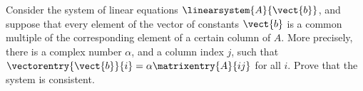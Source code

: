 Consider the system of linear equations $\linearsystem{A}{\vect{b}}$, and suppose that every element of the vector of constants $\vect{b}$ is a common multiple of the corresponding element of a certain column of $A$.  More precisely, there is a complex number $\alpha$, and a column index $j$, such that $\vectorentry{\vect{b}}{i}=\alpha\matrixentry{A}{ij}$ for all $i$.  Prove that the system is consistent.